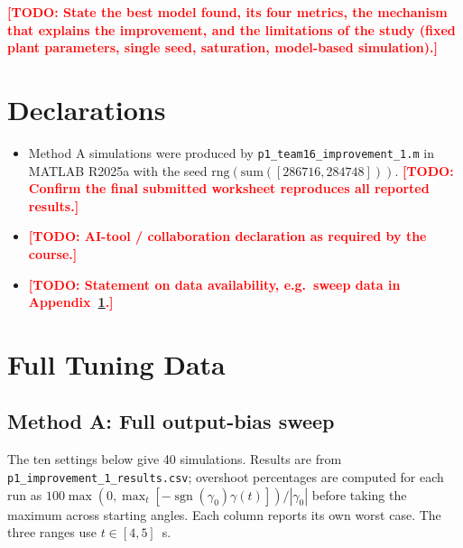 \documentclass[11pt,a4paper]{article}
\newcommand{\todo}[1]{\textcolor{red}{\textbf{[TODO: #1]}}}
\newcommand{\gam}{\ensuremath{\gamma}}
\begin{document}
\todo{State the best model found, its four metrics, the mechanism that
explains the improvement, and the limitations of the study (fixed plant
parameters, single seed, saturation, model-based simulation).}

\clearpage
\section*{Declarations}
\begin{itemize}[leftmargin=*]
  \item Method A simulations were produced by
        \texttt{p1\_team16\_improvement\_1.m} in MATLAB R2025a with the seed
        $\mathrm{rng}(\mathrm{sum}([286716, 284748]))$.
        \todo{Confirm the final submitted worksheet reproduces all reported results.}
  \item \todo{AI-tool / collaboration declaration as required by the course.}
  \item \todo{Statement on data availability, e.g.\ sweep data in
        Appendix~\ref{app:data}.}
\end{itemize}

\clearpage
{}



\clearpage
\appendix
\section{Full Tuning Data}
\label{app:data}

\subsection{Method A: Full output-bias sweep}
\label{app:method-a-data}

The ten settings below give 40 simulations. Results are from
\texttt{p1\_improvement\_1\_results.csv}; overshoot percentages are computed
for each run as $100\max(0,\max_t[-\operatorname{sgn}(\gam_0)\gam(t)])/|\gam_0|$
before taking the maximum across starting angles. Each column reports its
own worst case. The three ranges use $t\in[4,5]$~\si{\s}.
\end{document}
